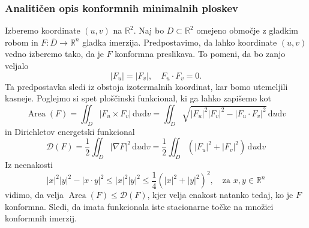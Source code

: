 \documentclass[8pt]{beamer}
\theoremstyle{definition}
\theoremstyle{remark}
\theoremstyle{plain}
\numberwithin{equation}{section}  %
\begin{document}
\begin{frame}
    \frametitle{Analitičen opis konformnih minimalnih ploskev}

    Izberemo koordinate $(u,v)$ na $\mathbb{R}^2$. Naj bo $D \subset \mathbb{R}^2$ omejeno območje z gladkim robom in $F: \overline{D} \rightarrow \mathbb{R}^n$ gladka imerzija. Predpostavimo, da lahko koordinate $(u,v)$ vedno izberemo tako, da je $F$ \textcolor{red1}{konformna preslikava}. To pomeni, da bo zanjo veljalo
    \begin{equation*}
        \left|F_u\right|=\left|F_v\right| , \quad F_u \cdot F_v=0.
    \end{equation*}
    Ta predpostavka sledi iz obstoja izotermalnih koordinat, kar bomo utemeljili kasneje. Poglejmo si spet \textcolor{red1}{ploščinski funkcional}, ki ga lahko zapišemo kot
    \begin{equation*}
        \operatorname{Area}(F)=\iint_D\left|F_u \times F_v\right| \, \mathrm{d} u \mathrm{d} v=\iint_D \sqrt{\left|F_u\right|^2\left|F_v\right|^2-\left|F_u \cdot F_v\right|^2} \, \mathrm{d} u \mathrm{d} v
    \end{equation*}
    in \textcolor{red1}{Dirichletov energetski funkcional}
    \begin{equation*}
        \mathscr{D}(F)=\frac{1}{2} \iint_D|\nabla F|^2 \, \mathrm{d} u \mathrm{d} v=\frac{1}{2} \iint_D\left(\left|F_u\right|^2+\left|F_v\right|^2\right) \, \mathrm{d} u \mathrm{d} v
    \end{equation*}
    Iz neenakosti 
    \begin{equation*}
        |x|^2|y|^2-|x \cdot y|^2 \leq|x|^2|y|^2 \leq \frac{1}{4}\left(|x|^2+|y|^2\right)^2, \quad \text{za }x, y \in \mathbb{R}^n         
    \end{equation*}
    vidimo, da velja $\operatorname{Area}(F) \leq \mathscr{D}(F)$, kjer velja enakost natanko tedaj, ko je $F$ konformna. Sledi, da imata funkcionala iste stacionarne točke na množici konformnih imerzij.

\end{frame}
\end{document}
